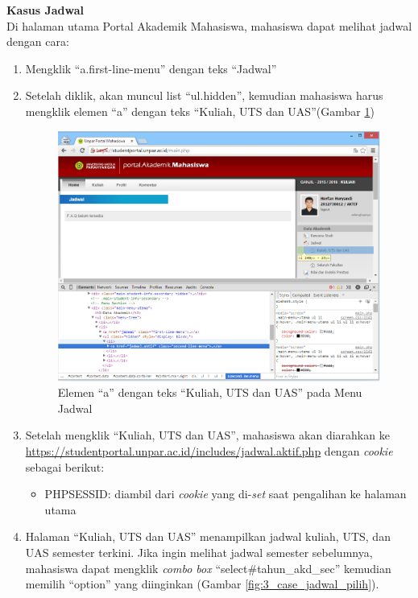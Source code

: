 \documentclass[a4paper,twoside]{article}
\begin{document}
\begin{enumerate}
\begin{enumerate}
\textbf{Kasus Jadwal}\\
Di halaman utama Portal Akademik Mahasiswa, mahasiswa dapat melihat jadwal dengan cara:
\begin{enumerate}
	\item Mengklik ``a.first-line-menu'' dengan teks ``Jadwal'' 
	\item Setelah diklik, akan muncul list ``ul.hidden'', kemudian mahasiswa harus mengklik elemen ``a'' dengan teks ``Kuliah, UTS dan UAS''(Gambar \ref{fig:3_case_jadwal_menu})
	\begin{figure}[H]
			\centering
			\includegraphics[scale=0.5]{Gambar/case-jadwal-menu}
			\caption{Elemen ``a'' dengan teks ``Kuliah, UTS dan UAS'' pada Menu Jadwal} 
			\label{fig:3_case_jadwal_menu}
		\end{figure}
		\item Setelah mengklik ``Kuliah, UTS dan UAS'', mahasiswa akan diarahkan ke \url{https://studentportal.unpar.ac.id/includes/jadwal.aktif.php} dengan \textit{cookie} sebagai berikut:
\begin{itemize}
	\item PHPSESSID: diambil dari \textit{cookie} yang di-\textit{set} saat pengalihan ke halaman utama
\end{itemize}
\item Halaman ``Kuliah, UTS dan UAS'' menampilkan jadwal kuliah, UTS, dan UAS semester terkini. Jika ingin melihat jadwal semester sebelumnya, mahasiswa dapat mengklik \textit{combo box} ``select\#tahun\_akd\_sec'' kemudian memilih ``option'' yang diinginkan (Gambar \ref{fig:3_case_jadwal_pilih}).
		

\end{enumerate}
\end{enumerate}
\end{enumerate}
\end{document}
